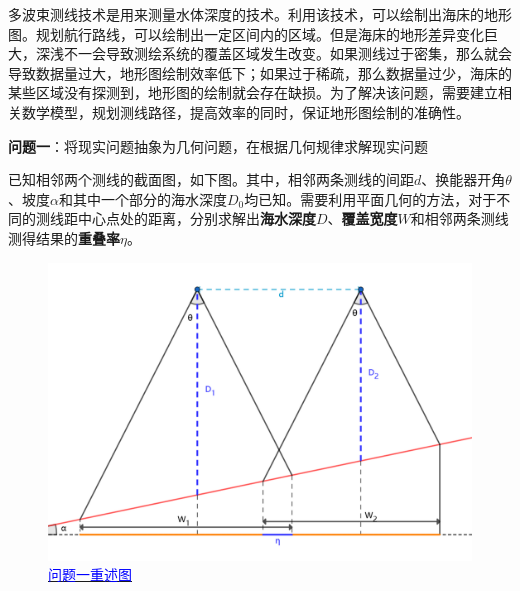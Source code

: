 \setcounter{page}{1}




多波束测线技术是用来测量水体深度的技术。利用该技术，可以绘制出海床的地形图。规划航行路线，可以绘制出一定区间内的区域。但是海床的地形差异变化巨大，深浅不一会导致测绘系统的覆盖区域发生改变。如果测线过于密集，那么就会导致数据量过大，地形图绘制效率低下；如果过于稀疏，那么数据量过少，海床的某些区域没有探测到，地形图的绘制就会存在缺损。为了解决该问题，需要建立相关数学模型，规划测线路径，提高效率的同时，保证地形图绘制的准确性。


\textbf{问题一}：将现实问题抽象为几何问题，在根据几何规律求解现实问题




已知相邻两个测线的截面图，如下图。其中，相邻两条测线的间距$d$、换能器开角$\theta$、坡度$\alpha$和其中一个部分的海水深度$D_0$均已知。需要利用平面几何的方法，对于不同的测线距中心点处的距离，分别求解出\textbf{海水深度}$D$、\textbf{覆盖宽度}$W$和相邻两条测线测得结果的\textbf{重叠率}$\eta$。

\begin{figure}[h]   
    \centering
    \includegraphics[scale=0.3]{res/img/问题一重述图.png}
    \caption{\href{https://www.geogebra.org/m/fza22fcy}{\textcolor{blue}{问题一重述图}}}
    \label{fig:问题一重述图}
\end{figure}

